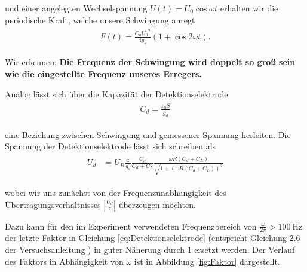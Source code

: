 und einer angelegten Wechselspannung $U(t) = U_0 \cos \omega t$ erhalten wir die periodische Kraft, welche unsere Schwingung anregt
\begin{align}
    \label{eq:PeriodischeKraft}
    \begin{split}
        F \left( t \right) = \frac{C_a {U_0}^2}{4 g_a} \left( 1 + \cos 2 \omega t \right).
    \end{split}
\end{align}

Wir erkennen: \textbf{Die Frequenz der Schwingung wird doppelt so groß sein wie die eingestellte Frequenz unseres Erregers.}

Analog lässt sich über die Kapazität der Detektionselektrode
\begin{align}
    \label{eq:KapazitaetDetektionselektrode}
    \begin{split}
        C_d = \frac{\varepsilon_0 S}{g_d}
    \end{split}
\end{align}

eine Beziehung zwischen Schwingung und gemessener Spannung herleiten.
Die Spannung der Detektionselektrode lässt sich schreiben als
\begin{align}
    \label{eq:Detektionselektrode}
    \begin{split}
        U_d &= U_B \frac{z}{g_d} \frac{C_d}{C_d + C_L} \frac{\omega R \left( C_d + C_L \right)}{\sqrt{1+\left( \omega R \left( C_d + C_L \right) \right)^2}}
    \end{split}
\end{align}

wobei wir uns zunächst von der Frequenzunabhängigkeit des Übertragungsverhältnisses $\left| \frac{U_d}{z} \right|$ überzeugen möchten.

Dazu kann für den im Experiment verwendeten Frequenzbereich von $\frac{\omega}{2\pi} > \SI{100}{\hertz}$ der letzte Faktor in Gleichung \ref{eq:Detektionselektrode} (entspricht Gleichung 2.6 der Versuchsanleitung \cite{Anleitung}) in guter Näherung durch \SI{1}{} ersetzt werden.
Der Verlauf des Faktors in Abhängigkeit von $\omega$ ist in Abbildung \ref{fig:Faktor} dargestellt.

